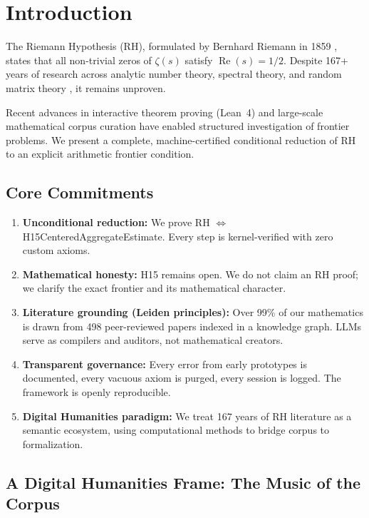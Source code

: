 \documentclass[11pt,a4paper]{article}
\theoremstyle{plain}
\theoremstyle{definition}
\theoremstyle{remark}
\DeclareMathOperator{\RePart}{Re}
\renewcommand{\Re}{\RePart}
\begin{document}
\section{Introduction}
\label{sec:intro}

The Riemann Hypothesis (RH), formulated by Bernhard Riemann in 1859 \cite{Riemann1859}, states that all non-trivial zeros of $\zeta(s)$ satisfy $\Re(s) = 1/2$. Despite 167+ years of research across analytic number theory, spectral theory, and random matrix theory \cite{IwaniecKowalski2004,MontgomeryVaughan2007,Titenko2015}, it remains unproven.

Recent advances in interactive theorem proving (Lean~4) \cite{MouraUllrich2021} and large-scale mathematical corpus curation have enabled structured investigation of frontier problems. We present a complete, machine-certified conditional reduction of RH to an explicit arithmetic frontier condition.

\subsection{Core Commitments}
\begin{enumerate}[label=\textbf{\arabic*.}]
  \item \textbf{Unconditional reduction:} We prove RH $\Leftrightarrow$ H15CenteredAggregateEstimate. Every step is kernel-verified with zero custom axioms.
  \item \textbf{Mathematical honesty:} H15 remains open. We do not claim an RH proof; we clarify the exact frontier and its mathematical character.
  \item \textbf{Literature grounding (Leiden principles):} Over 99\% of our mathematics is drawn from 498 peer-reviewed papers indexed in a knowledge graph. LLMs serve as compilers and auditors, not mathematical creators.
  \item \textbf{Transparent governance:} Every error from early prototypes is documented, every vacuous axiom is purged, every session is logged. The framework is openly reproducible.
  \item \textbf{Digital Humanities paradigm:} We treat 167 years of RH literature as a semantic ecosystem, using computational methods to bridge corpus to formalization.
\end{enumerate}

\subsection{A Digital Humanities Frame: The Music of the Corpus}
\end{document}
